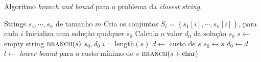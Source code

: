 \begin{algorithm}[!h]
    \caption{Algoritmo \textit{branch and bound} para o problema da \textit{closest string}.}
    \label{alg:tree}
    \begin{algorithmic}
        \Require Strings $s_1, \cdots, s_n$ de tamanho $m$
        \State Cria os conjuntos $S_i = \left\{s_1[i], \cdots, s_n[i]\right\}$, para cada $i$
        \State Inicializa uma solução qualquer $s_0$
        \State Calcula o valor $d_0$ da solução $s_0$
        \State $s \gets$ empty string
        \State $\textsc{branch}(s)$        
        \State \Return $s_0, d_0$
        \State
            \State $i = \text{length}(s)$
                \State $d \gets$ custo de $s$
                    \State $s_0 \gets s$
                    \State $d_0 \gets d$
                \EndIf
                \State \Return
            \EndIf
            \State $l \gets$ \textit{lower bound} para o custo mínimo de $s$ 
                \State \Return
            \EndIf
                \State $\textsc{branch}(s + \text{char})$ 
            \EndFor
        \EndProcedure
    \end{algorithmic}
\end{algorithm}
